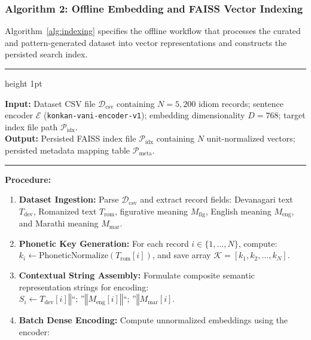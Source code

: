 \documentclass[12pt,a4paper]{article}
\begin{document}
\subsubsection{Algorithm 2: Offline Embedding and FAISS Vector Indexing}
Algorithm~\ref{alg:indexing} specifies the offline workflow that processes the curated and pattern-generated dataset into vector representations and constructs the persisted search index.

\begin{table}[H]
\centering
\caption{Algorithm 2: Offline Embedding and FAISS Vector Index Construction}
\label{alg:indexing}
\vspace{4pt}
\hrule height 1pt
\vspace{6pt}
\begin{minipage}{0.96\linewidth}
\textbf{Input:} Dataset CSV file $\mathcal{D}_{\mathrm{csv}}$ containing $N = 5{,}200$ idiom records; sentence encoder $\mathcal{E}$ (\texttt{konkan-vani-encoder-v1}); embedding dimensionality $D = 768$; target index file path $\mathcal{P}_{\mathrm{idx}}$.\\[3pt]
\textbf{Output:} Persisted FAISS index file $\mathcal{P}_{\mathrm{idx}}$ containing $N$ unit-normalized vectors; persisted metadata mapping table $\mathcal{P}_{\mathrm{meta}}$.\\[4pt]
\hrule
\vspace{6pt}
\textbf{Procedure:}
\begin{enumerate}
  \itemsep 2pt
  \item \textbf{Dataset Ingestion:} Parse $\mathcal{D}_{\mathrm{csv}}$ and extract record fields: Devanagari text $T_{\mathrm{dev}}$, Romanized text $T_{\mathrm{rom}}$, figurative meaning $M_{\mathrm{fig}}$, English meaning $M_{\mathrm{eng}}$, and Marathi meaning $M_{\mathrm{mar}}$.
  \item \textbf{Phonetic Key Generation:} For each record $i \in \{1, \dots, N\}$, compute:\\
  $k_i \leftarrow \mathrm{PhoneticNormalize}(T_{\mathrm{rom}}[i])$, and save array $\mathcal{K} = [k_1, k_2, \dots, k_N]$.
  \item \textbf{Contextual String Assembly:} Formulate composite semantic representation strings for encoding:\\
  $S_i \leftarrow T_{\mathrm{dev}}[i] \mathbin{\Vert} \text{``; ''} \mathbin{\Vert} M_{\mathrm{eng}}[i] \mathbin{\Vert} \text{``; ''} \mathbin{\Vert} M_{\mathrm{mar}}[i]$.
  \item \textbf{Batch Dense Encoding:} Compute unnormalized embeddings using the encoder:\\

\end{enumerate}
\end{minipage}
\end{table}
\end{document}
